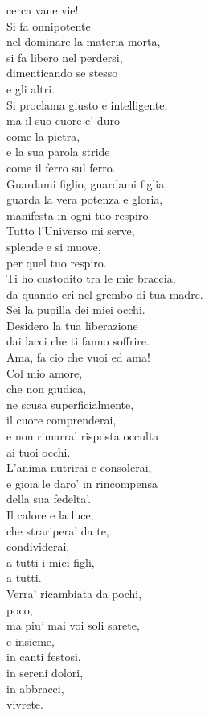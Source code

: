 \begin{vcentered}
{    cerca vane vie!\\
    Si fa onnipotente \\
    nel dominare la materia morta,\\
    si fa libero nel perdersi,\\
    dimenticando se stesso\\
    e gli altri.\\
    Si proclama giusto e intelligente,\\
    ma il suo cuore e' duro\\
    come la pietra,\\
    e la sua parola stride \\
    come il ferro sul ferro.\\
Guardami figlio, guardami figlia, \\
    guarda la vera potenza e gloria,\\
    manifesta in ogni tuo respiro.\\
    Tutto l'Universo mi serve,\\
    splende e si muove,\\
    per quel tuo respiro.\\
    Ti ho custodito tra le mie braccia,\\
    da quando eri nel grembo di tua madre.\\
    Sei la pupilla dei miei occhi.\\
    Desidero la tua liberazione\\
    dai lacci che ti fanno soffrire.\\
    Ama, fa cio che vuoi ed ama!\\
    Col mio amore,\\
    che non giudica,\\
    ne scusa superficialmente,\\
    il cuore comprenderai,\\
    e non rimarra' risposta occulta\\
    ai tuoi occhi.\\
    L'anima nutrirai e consolerai,\\
    e gioia le daro' in rincompensa\\
    della sua fedelta'.\\
    Il calore e la luce,\\
    che straripera' da te,\\
    condividerai,\\
    a tutti i miei figli,\\
    a tutti.\\
    Verra' ricambiata da pochi,\\
    poco,\\
    ma piu' mai voi soli sarete,\\
    e insieme, \\
    in canti festosi,\\
    in sereni dolori,\\
    in abbracci,\\
    vivrete.\\
    }
\end{vcentered}
